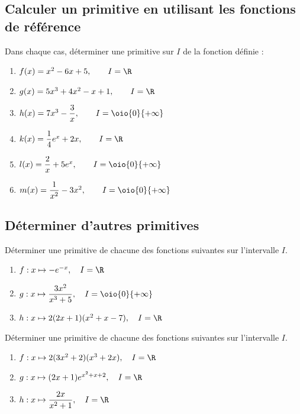 \documentclass[a4paper,11pt,exos]{nsi} %
\begin{document}
\subsection*{Calculer un primitive en utilisant les fonctions de référence}
\exo{}
Dans chaque cas, déterminer une primitive sur $I$ de la fonction définie :
\begin{multicols}{2}
    \begin{enumerate}
        \item $f(x)=x^2-6x+5, \qquad I=\R$
        \item $g(x)=5x^3+4x^2-x+1, \qquad I=\R$
        \item $h(x)=7x^3-\dfrac{3}{x}, \qquad I=\oio{0}{+\infty}$
        \item $k(x)=\dfrac{1}{4}e^x+2x, \qquad I=\R$
        \item $l(x)=\dfrac{2}{x}+5e^x, \qquad I=\oio{0}{+\infty}$
        \item $m(x)=\dfrac{1}{x^2}-3x^2, \qquad I=\oio{0}{+\infty}$
    \end{enumerate}
\end{multicols}

\newpage

\subsection*{Déterminer d'autres primitives}

\exo{}
Déterminer une primitive de chacune des fonctions suivantes sur l'intervalle $I$.
\begin{enumerate}
    \item $f:x\mapsto -e^{-x}, \quad I=\R$
    \item $g:x\mapsto \dfrac{3x^2}{x^3+5}, \quad I=\oio{0}{+\infty}$
    \item $h:x\mapsto 2(2x+1)(x^2+x-7), \quad I=\R$
\end{enumerate}

\exo{}
Déterminer une primitive de chacune des fonctions suivantes sur l'intervalle $I$.
    \begin{enumerate}
        \item $f:x\mapsto 2(3x^2+2)(x^3+2x), \quad I=\R$
        \item $g:x\mapsto (2x+1)e^{x^2+x+2}, \quad I=\R$
        \item $h:x\mapsto \dfrac{2x}{x^2+1}, \quad I=\R$
    \end{enumerate}
\end{document}
